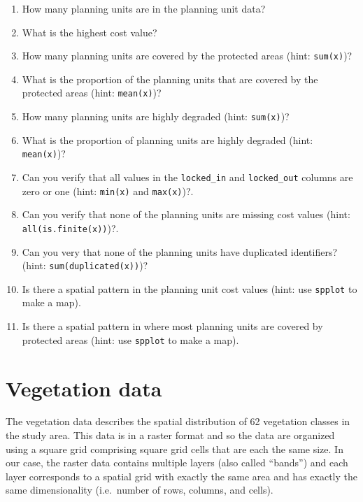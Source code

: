 \documentclass[
  12pt,
]{book}
\providecommand{\tightlist}{%
  \setlength{\itemsep}{0pt}\setlength{\parskip}{0pt}}
\begin{document}
\begin{rmdquestion}
\begin{enumerate}
\def\labelenumi{\arabic{enumi}.}
\tightlist
\item
  How many planning units are in the planning unit data?
\item
  What is the highest cost value?
\item
  How many planning units are covered by the protected areas (hint: \texttt{sum(x)})?
\item
  What is the proportion of the planning units that are covered by the protected areas (hint: \texttt{mean(x)})?
\item
  How many planning units are highly degraded (hint: \texttt{sum(x)})?
\item
  What is the proportion of planning units are highly degraded (hint: \texttt{mean(x)})?
\item
  Can you verify that all values in the \texttt{locked\_in} and \texttt{locked\_out} columns are zero or one (hint: \texttt{min(x)} and \texttt{max(x)})?.
\item
  Can you verify that none of the planning units are missing cost values (hint: \texttt{all(is.finite(x))})?.
\item
  Can you very that none of the planning units have duplicated identifiers? (hint: \texttt{sum(duplicated(x))})?
\item
  Is there a spatial pattern in the planning unit cost values (hint: use \texttt{spplot} to make a map).
\item
  Is there a spatial pattern in where most planning units are covered by protected areas (hint: use \texttt{spplot} to make a map).
\end{enumerate}
\end{rmdquestion}

\clearpage

\hypertarget{vegetation-data}{%
\section{Vegetation data}\label{vegetation-data}}

The vegetation data describes the spatial distribution of 62 vegetation classes in the study area. This data is in a raster format and so the data are organized using a square grid comprising square grid cells that are each the same size. In our case, the raster data contains multiple layers (also called ``bands'') and each layer corresponds to a spatial grid with exactly the same area and has exactly the same dimensionality (i.e.~number of rows, columns, and cells).
\end{document}
